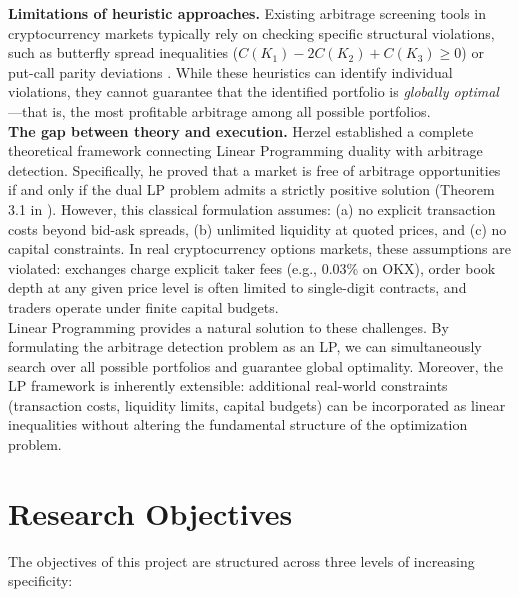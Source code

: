 \documentclass[openany]{book}
\numberwithin{figure}{chapter}
\numberwithin{equation}{chapter}
\begin{document}
\textbf{Limitations of heuristic approaches.} Existing arbitrage screening tools in cryptocurrency markets typically rely on checking specific structural violations, such as butterfly spread inequalities ($C(K_1) - 2C(K_2) + C(K_3) \geq 0$) or put-call parity deviations \cite{alexander2024}. While these heuristics can identify individual violations, they cannot guarantee that the identified portfolio is \textit{globally optimal}---that is, the most profitable arbitrage among all possible portfolios.\\

\textbf{The gap between theory and execution.} Herzel \cite{herzel2005} established a complete theoretical framework connecting Linear Programming duality with arbitrage detection. Specifically, he proved that a market is free of arbitrage opportunities if and only if the dual LP problem admits a strictly positive solution (Theorem 3.1 in \cite{herzel2005}). However, this classical formulation assumes: (a) no explicit transaction costs beyond bid-ask spreads, (b) unlimited liquidity at quoted prices, and (c) no capital constraints. In real cryptocurrency options markets, these assumptions are violated: exchanges charge explicit taker fees (e.g., 0.03\% on OKX), order book depth at any given price level is often limited to single-digit contracts, and traders operate under finite capital budgets.\\

Linear Programming provides a natural solution to these challenges. By formulating the arbitrage detection problem as an LP, we can simultaneously search over all possible portfolios and guarantee global optimality. Moreover, the LP framework is inherently extensible: additional real-world constraints (transaction costs, liquidity limits, capital budgets) can be incorporated as linear inequalities without altering the fundamental structure of the optimization problem.

\section{Research Objectives}

The objectives of this project are structured across three levels of increasing specificity:
\end{document}
